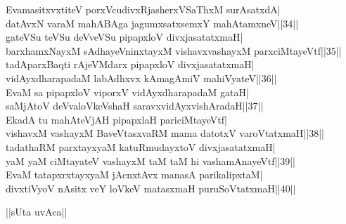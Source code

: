 \documentclass{article}
\begin{document}
EvamasitxvxtiteV porxVcudivxRjasherxVSaThxM surAsatxdA|\\
datAvxN varaM mahABAga jagumxsatxsemxY mahAtamxneV||34||\\
gateVSu teVSu deVveVSu pipapxloV divxjasatatxmaH|\\
barxhamxNayxM sAdhayeVninxtayxM vishavxvashayxM parxciMtayeVtf||35||\\
tadAparxBaqti rAjeVMdarx pipapxloV divxjasatatxmaH|\\
vidAyxdharapadaM labAdhxvx kAmagAmiV mahiVyateV||36||\\
EvaM sa pipapxloV viporxV vidAyxdharapadaM gataH|\\
saMjAtoV deVvaloVkeVshaH saravxvidAyxvishAradaH||37||\\
EkadA tu mahAteVjAH pipapxlaH pariciMtayeVtf|\\
vishavxM vashayxM BaveVtasxvaRM mama datotxV varoVtatxmaH||38||\\
tadathaRM parxtayxyaM katuRmudayxtoV divxjasatatxmaH|\\
yaM yaM ciMtayateV vashayxM taM taM hi vashamAnayeVtf||39||\\
EvaM tatapxrxtayxyaM jAcnxtAvx manasA parikalipxtaM|\\
divxtiVyoV nAsitx veY loVkeV matasxmaH puruSoVtatxmaH||40||\\

\begin{center}
||sUta uvAca||
\end{center}
\end{document}
